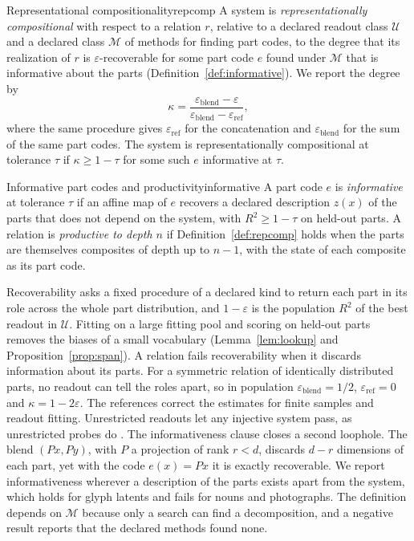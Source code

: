 \documentclass[10pt]{article}
\theoremstyle{plain}
\theoremstyle{remark}
\newcommand{\U}{\mathcal{U}}
\newcommand{\M}{\mathcal{M}}
\begin{document}
\begin{defbox}{Representational compositionality}{repcomp}
A system is \emph{representationally compositional} with respect to a relation $r$, relative to a declared readout class $\U$ and a declared class $\M$ of methods for finding part codes, to the degree that its realization of $r$ is $\varepsilon$-recoverable for some part code $e$ found under $\M$ that is informative about the parts (Definition~\ref{def:informative}). We report the degree by
\begin{equation}
  \kappa = \frac{\varepsilon_{\mathrm{blend}} - \varepsilon}{\varepsilon_{\mathrm{blend}} - \varepsilon_{\mathrm{ref}}},
  \label{eq:kappa}
\end{equation}
where the same procedure gives $\varepsilon_{\mathrm{ref}}$ for the concatenation and $\varepsilon_{\mathrm{blend}}$ for the sum of the same part codes. The system is representationally compositional at tolerance $\tau$ if $\kappa \ge 1 - \tau$ for some such $e$ informative at $\tau$.
\end{defbox}

\begin{defbox}{Informative part codes and productivity}{informative}
A part code $e$ is \emph{informative} at tolerance $\tau$ if an affine map of $e$ recovers a declared description $z(x)$ of the parts that does not depend on the system, with $R^2 \ge 1 - \tau$ on held-out parts. A relation is \emph{productive to depth $n$} if Definition~\ref{def:repcomp} holds when the parts are themselves composites of depth up to $n - 1$, with the state of each composite as its part code.
\end{defbox}

Recoverability asks a fixed procedure of a declared kind to return each part in its role across the whole part distribution, and $1 - \varepsilon$ is the population $R^2$ of the best readout in $\U$. Fitting on a large fitting pool and scoring on held-out parts removes the biases of a small vocabulary (Lemma~\ref{lem:lookup} and Proposition~\ref{prop:span}). A relation fails recoverability when it discards information about its parts. For a symmetric relation of identically distributed parts, no readout can tell the roles apart, so in population $\varepsilon_{\mathrm{blend}} = 1/2$, $\varepsilon_{\mathrm{ref}} = 0$ and $\kappa = 1 - 2\varepsilon$. The references correct the estimates for finite samples and readout fitting. Unrestricted readouts let any injective system pass, as unrestricted probes do \citep{hewitt2019}. The informativeness clause closes a second loophole. The blend $(Px, Py)$, with $P$ a projection of rank $r < d$, discards $d - r$ dimensions of each part, yet with the code $e(x) = Px$ it is exactly recoverable. We report informativeness wherever a description of the parts exists apart from the system, which holds for glyph latents and fails for nouns and photographs. The definition depends on $\M$ because only a search can find a decomposition, and a negative result reports that the declared methods found none.
\end{document}
